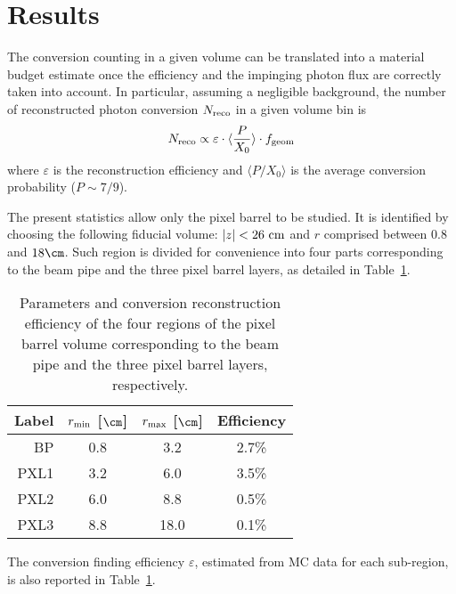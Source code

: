 \section{Results}
\label{results}

The conversion counting in a given volume can be translated into a material budget estimate once the efficiency and the impinging 
photon flux are correctly taken into account. 
In particular, assuming a negligible background, the number of reconstructed photon conversion $N_{\rm reco}$ in a given volume bin is
\begin{equation}
N_{\rm reco} \propto \varepsilon \cdot \langle \frac{P}{X_0} \rangle \cdot f_{\rm geom}
\end{equation}
where $\varepsilon$ is the reconstruction efficiency and $\langle P/{X_0} \rangle$ is the average conversion probability ($P\sim 7/9$).

The present statistics allow only the pixel barrel to be studied. 
It is identified by choosing the following fiducial volume: $|z|<26~{\rm cm}$ and $r$ comprised between $0.8$ and $18\cm$.
Such region is divided for convenience into four parts corresponding to the beam pipe and the three pixel barrel layers, as detailed in Table~\ref{table:bins}.


\begin{table}[h]
\begin{center}
  \begin{tabular}{rccc}
    Label & $r_{\rm min}$ [$\cm$] & $r_{\rm max}$ [$\cm$] & Efficiency \\  
\hline
BP & 0.8 & 3.2 & 2.7\% \\
PXL1 & 3.2 & 6.0   & 3.5\% \\
PXL2 & 6.0 & 8.8 & 0.5\% \\
PXL3 & 8.8 & 18.0  & 0.1\% \\
  \end{tabular}
  \caption{Parameters and conversion reconstruction efficiency of the four regions of the pixel barrel volume corresponding to the beam pipe and the three pixel barrel layers, respectively.}
\label{table:bins}
\end{center}
\end{table}



The conversion finding efficiency $\varepsilon$, estimated from MC data for each sub-region, is also reported in Table~\ref{table:bins}.

